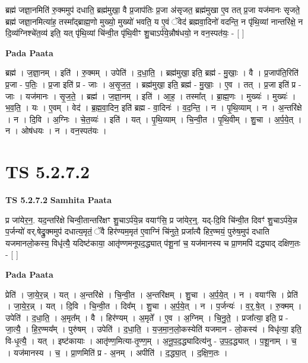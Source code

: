 \documentclass[17pt]{extarticle}
\begin{document}
ब्रह्म॑ जज्ञा॒नमिति॑ रु॒क्ममुप॑ दधाति॒ ब्रह्म॑मुखा॒ वै प्र॒जाप॑तिः प्र॒जा अ॑सृजत॒ ब्रह्म॑मुखा ए॒व तत् प्र॒जा यज॑मानः सृजते॒ ब्रह्म॑ जज्ञा॒नमित्या॑ह॒ तस्मा᳚द्ब्राह्म॒णो मुख्यो॒ मुख्यो॑ भवति॒ य ए॒वं ॅवेद॑ ब्रह्मवा॒दिनो॑ वदन्ति॒ न पृ॑थि॒व्यां नान्तरि॑क्षे॒ न दि॒व्य॑ग्निश्चे॑त॒व्य॑ इति॒ यत् पृ॑थि॒व्यां चि॑न्वी॒त पृ॑थि॒वीꣳ शु॒चाऽर्प॑ये॒न्नौष॑धयो॒ न वन॒स्पत॑यः॒ - [  ] \newline

\textbf{Pada Paata} \newline

ब्रह्म॑ । ज॒ज्ञा॒नम् । इति॑ । रु॒क्मम् । उपेति॑ । द॒धा॒ति॒ । ब्रह्म॑मुखा॒ इति॒ ब्रह्म॑ - मु॒खाः॒ । वै । प्र॒जाप॑ति॒रिति॑ प्र॒जा - प॒तिः॒ । प्र॒जा इति॑ प्र - जाः । अ॒सृ॒ज॒त॒ । ब्रह्म॑मुखा॒ इति॒ ब्रह्म॑ - मु॒खाः॒ । ए॒व । तत् । प्र॒जा इति॑ प्र - जाः । यज॑मानः । सृ॒ज॒ते॒ । ब्रह्म॑ । ज॒ज्ञा॒नम् । इति॑ । आ॒ह॒ । तस्मा᳚त् । ब्रा॒ह्म॒णः । मुख्यः॑ । मुख्यः॑ । भ॒व॒ति॒ । यः । ए॒वम् । वेद॑ । ब्र॒ह्म॒वा॒दिन॒ इति॑ ब्रह्म - वा॒दिनः॑ । व॒द॒न्ति॒ । न । पृ॒थि॒व्याम् । न । अ॒न्तरि॑क्षे । न । दि॒वि । अ॒ग्निः । चे॒त॒व्यः॑ । इति॑ । यत् । पृ॒थि॒व्याम् । चि॒न्वी॒त । पृ॒थि॒वीम् । शु॒चा । अ॒र्प॒ये॒त् । न । ओष॑धयः । न । वन॒स्पत॑यः ।  \newline




\section*{ TS 5.2.7.2 }

\textbf{TS 5.2.7.2 } \newline
\textbf{Samhita Paata} \newline

प्र जा॑येर॒न॒. यद॒न्तरि॑क्षे चिन्वी॒तान्तरि॑क्षꣳ शु॒चाऽर्प॑ये॒न्न वयाꣳ॑सि॒ प्र जा॑येर॒न्॒. यद्-दि॒वि चि॑न्वी॒त दिवꣳ॑ शु॒चाऽर्प॑ये॒न्न प॒र्जन्यो॑ वर्.षेद्रु॒क्ममुप॑ दधात्य॒मृतं॒ ॅवै हिर॑ण्यम॒मृत॑ ए॒वाग्निं चि॑नुते॒ प्रजा᳚त्यै हिर॒ण्मयं॒ पुरु॑ष॒मुप॑ दधाति यजमानलो॒कस्य॒ विधृ॑त्यै॒ यदिष्ट॑काया॒ आतृ॑ण्णमनूपद॒द्ध्यात् प॑शू॒नां च॒ यज॑मानस्य च प्रा॒णमपि॑ दद्ध्याद् दक्षिण॒तः - [  ] \newline

\textbf{Pada Paata} \newline

प्रेति॑ । जा॒ये॒र॒न्न् । यत् । अ॒न्तरि॑क्षे । चि॒न्वी॒त । अ॒न्तरि॑क्षम् । शु॒चा । अ॒र्प॒ये॒त् । न । वयाꣳ॑सि । प्रेति॑ । जा॒ये॒र॒न्न् । यत् । दि॒वि । चि॒न्वी॒त । दिव᳚म् । शु॒चा । अ॒र्प॒ये॒त् । न । प॒र्जन्यः॑ । व॒र्॒.षे॒त् । रु॒क्मम् । उपेति॑ । द॒धा॒ति॒ । अ॒मृत᳚म् । वै । हिर॑ण्यम् । अ॒मृते᳚ । ए॒व । अ॒ग्निम् । चि॒नु॒ते॒ । प्रजा᳚त्या॒ इति॒ प्र - जा॒त्यै॒ । हि॒र॒ण्मय᳚म् । पुरु॑षम् । उपेति॑ । द॒धा॒ति॒ । य॒ज॒मा॒न॒लो॒कस्येति॑ यजमान - लो॒कस्य॑ । विधृ॑त्या॒ इति॒ वि-धृ॒त्यै॒ । यत् । इष्ट॑कायाः । आतृ॑ण्ण॒मित्या-तृ॒ण्ण॒म् । अ॒नू॒प॒द॒द्ध्यादित्य॑नु - उ॒प॒द॒द्ध्यात् । प॒शू॒नाम् । च॒ । यज॑मानस्य । च॒ । प्रा॒णमिति॑ प्र - अ॒नम् । अपीति॑ । द॒द्ध्या॒त् । द॒क्षि॒ण॒तः ।  \newline
\end{document}
